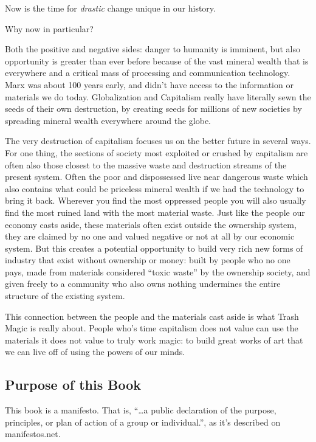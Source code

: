 Now is the time for \emph{drastic} change unique in our history.

Why now in particular?

Both the positive and negative sides: danger to humanity is imminent,
but also opportunity is greater than ever before because of the vast
mineral wealth that is everywhere and a critical mass of processing and
communication technology. Marx was about 100 years early, and didn't
have access to the information or materials we do today. Globalization
and Capitalism really have literally sewn the seeds of their own
destruction, by creating seeds for millions of new societies by
spreading mineral wealth everywhere around the globe.

The very destruction of capitalism focuses us on the better future in
several ways. For one thing, the sections of society most exploited or
crushed by capitalism are often also those closest to the massive waste
and destruction streams of the present system. Often the poor and
dispossessed live near dangerous waste which also contains what could be
priceless mineral wealth if we had the technology to bring it back.
Wherever you find the most oppressed people you will also usually find
the most ruined land with the most material waste. Just like the people
our economy casts aside, these materials often exist outside the
ownership system, they are claimed by no one and valued negative or not
at all by our economic system. But this creates a potential opportunity
to build very rich new forms of industry that exist without ownership or
money: built by people who no one pays, made from materials considered
``toxic waste'' by the ownership society, and given freely to a
community who also owns nothing undermines the entire structure of the
existing system.

This connection between the people and the materials cast aside is what
Trash Magic is really about. People who's time capitalism does not value
can use the materials it does not value to truly work magic: to build
great works of art that we can live off of using the powers of our
minds.

\subsection{Purpose of this Book}\label{purpose-of-this-book}

This book is a manifesto. That is, ``\ldots{}a public declaration of the
purpose, principles, or plan of action of a group or individual.'', as
it's described on manifestos.net.

